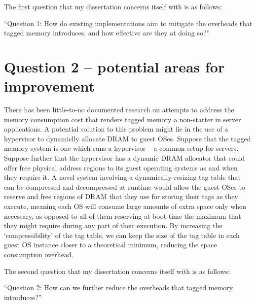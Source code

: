 The first question that my dissertation concerns itself with is as follows:
\begin{center}
	``Question 1: How do existing implementations aim to mitigate the overheads that tagged memory introduces, and how effective are they at doing so?''
\end{center}

\section{Question 2 -- potential areas for improvement}
There has been little-to-no documented research on attempts to address the memory consumption cost that renders tagged memory a non-starter in server applications. A potential solution to this problem might lie in the use of a hypervisor to dynamiclly allocate DRAM to guest OSes. Suppose that the tagged memory system is one which runs a hypervisor -- a common setup for servers. Suppose further that the hypervisor has a dynamic DRAM allocator that could offer free physical address regions to its guest operating systems as and when they require it. A novel system involving a dynamically-resizing tag table that can be compressed and decompressed at runtime would allow the guest OSes to reserve and free regions of DRAM that they use for storing their tags as they execute, meaning each OS will consume large amounts of extra space only when necessary, as opposed to all of them reserving at boot-time the maximum that they might require during any part of their execution. By increasing the `compressibility' of the tag table, we can keep the size of the tag table in each guest OS instance closer to a theoretical minimum, reducing the space consumption overhead.

The second question that my dissertation concerns itself with is as follows:
\begin{center}
	``Question 2: How can we further reduce the overheads that tagged memory introduces?''
\end{center}

